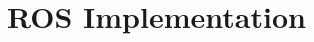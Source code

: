 \documentclass[a4paper,12pt]{article}
\begin{document}
	
	\section{ROS Implementation}

		

	
	
	


	\newpage
	\appendix
	\appendixpage
	\addappheadtotoc
	
\end{document}
